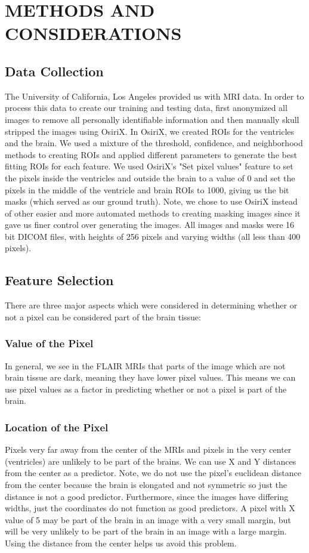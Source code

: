 \documentclass[letterpaper, 10 pt, conference]{ieeeconf}
\begin{document}
\section{METHODS AND CONSIDERATIONS}

\subsection{Data Collection}
The University of California, Los Angeles provided us with MRI data. In order to process this data to create our training and testing data, first anonymized all images to remove all personally identifiable information and then manually skull stripped the images using OsiriX. In OsiriX, we created ROIs for the ventricles and the brain. We used a mixture of the threshold, confidence, and neighborhood methods to creating ROIs and applied different parameters to generate the best fitting ROIs for each feature. We used OsiriX's "Set pixel values" feature to set the pixels inside the ventricles and outside the brain to a value of 0 and set the pixels in the middle of the ventricle and brain ROIs to 1000, giving us the bit masks (which served as our ground truth). Note, we chose to use OsiriX instead of other easier and more automated methods to creating masking images since it gave us finer control over generating the images. All images and masks were 16 bit DICOM files, with heights of 256 pixels and varying widths (all less than 400 pixels).

\subsection{Feature Selection}
There are three major aspects which were considered in determining whether or not a pixel can be considered part of the brain tissue:
\subsubsection{Value of the Pixel}
In general, we see in the FLAIR MRIs that parts of the image which are not brain tissue are dark, meaning they have lower pixel values. This means we can use pixel values as a factor in predicting whether or not a pixel is part of the brain.
\subsubsection{Location of the Pixel}
Pixels very far away from the center of the MRIs and pixels in the very center (ventricles) are unlikely to be part of the brains. We can use X and Y distances from the center as a predictor. Note, we do not use the pixel's euclidean distance from the center because the brain is elongated and not symmetric so just the distance is not a good predictor. Furthermore, since the images have differing widths, just the coordinates do not function as good predictors. A pixel with X value of 5 may be part of the brain in an image with a very small margin, but will be very unlikely to be part of the brain in an image with a large margin. Using the distance from the center helps us avoid this problem.
\end{document}
